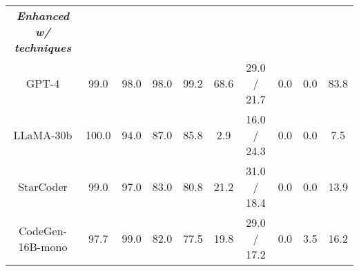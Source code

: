 \begin{table}[]
\begin{adjustbox}{max width=\textwidth}
\begin{tabular}{@{}cccccccccc@{}}
\midrule
\textit{\textbf{Enhanced w/ techniques}}      & \multicolumn{1}{l}{}                    & \multicolumn{1}{l}{}                & \multicolumn{1}{l}{} & \multicolumn{1}{l}{} & \multicolumn{1}{l}{} & \multicolumn{1}{l}{}                   & \multicolumn{1}{l}{} & \multicolumn{1}{l}{} & \multicolumn{1}{l}{}                \\
GPT-4                                      & 99.0                                    & 98.0                                & 98.0                 & 99.2                 & 68.6                 & 29.0 / 21.7                            & 0.0                  & 0.0                  & 83.8                                \\
LLaMA-30b                                     & 100.0           & 94.0            & 87.0            & 85.8            & 2.9             & 16.0 / 24.3 & 0.0             & 0.0             & 7.5             \\
StarCoder                                     & 99.0            & 97.0            & 83.0            & 80.8            & 21.2            & 31.0 / 18.4 & 0.0             & 0.0             & 13.9            \\
CodeGen-16B-mono                              & 97.7            & 99.0            & 82.0            & 77.5            & 19.8            & 29.0 / 17.2 & 0.0             & 3.5             & 16.2                    \\
\bottomrule
\end{tabular}
\end{adjustbox}
\end{table}



